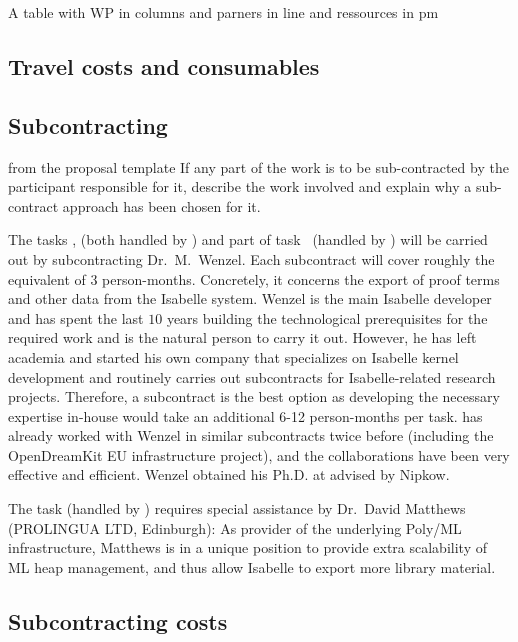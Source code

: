 {\color{red} A table with WP in columns and parners in line and
  ressources in pm}

\subsection{Travel costs and consumables}\label{sec:travel-costs}

\subsection{Subcontracting}\label{sec:subcontracting}

\begin{todo}{from the proposal template}
  If any part of the work is to be sub-contracted by the participant responsible for it,
  describe the work involved and explain why a sub-contract approach has been chosen for
  it.
\end{todo}

The tasks ,
 (both handled by ) and part of
task~ (handled by ) will
be carried out by subcontracting Dr.\ M.\ Wenzel.  Each subcontract
will cover roughly the equivalent of $3$ person-months.  Concretely,
it concerns the export of proof terms and other data from the Isabelle
system.  Wenzel is the main Isabelle developer and has spent the
last $10$ years building the technological prerequisites for the
required work and is the natural person to carry it out.  However, he
has left academia and started his own company that specializes on
Isabelle kernel development and routinely carries out subcontracts for
Isabelle-related research projects.  Therefore, a subcontract is the
best option as developing the necessary expertise in-house would take
an additional 6-12 person-months per task.   has already worked with
Wenzel in similar subcontracts twice before (including the
OpenDreamKit EU infrastructure project), and the collaborations have
been very effective and efficient. Wenzel obtained his Ph.D. at
 advised by Nipkow.

The task  (handled by )
requires special assistance by Dr.\ David Matthews (PROLINGUA LTD,
Edinburgh): As provider of the underlying Poly/ML infrastructure,
Matthews is in a unique position to provide extra scalability of ML
heap management, and thus allow Isabelle to export more library
material.

\subsection{Subcontracting costs}\label{sec:subcontracting-costs}

